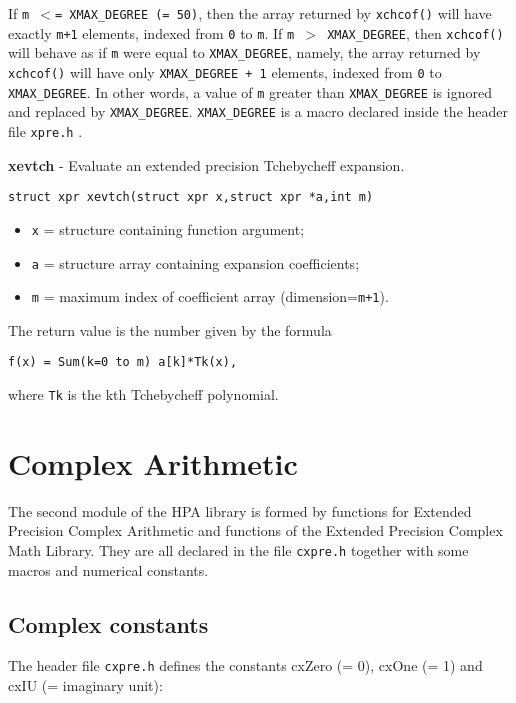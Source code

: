 \documentclass{article}
\begin{document}
If \texttt{m $<$= XMAX\_DEGREE (= 50)}, then the array returned by \texttt{xchcof()}
will have exactly \texttt{m+1} elements, indexed from \texttt{0} to \texttt{m}.
If \texttt{m $>$ XMAX\_DEGREE}, then \texttt{xchcof()} will behave as if
\texttt{m} were equal to \texttt{XMAX\_DEGREE}, namely,
the array returned by \texttt{xchcof()} will have only 
\texttt{XMAX\_DEGREE + 1} elements, indexed from \texttt{0} to \texttt{XMAX\_DEGREE}. 
In other words, a value of \texttt{m} greater than \texttt{XMAX\_DEGREE} is 
ignored and replaced by \texttt{XMAX\_DEGREE}.
\texttt{XMAX\_DEGREE} is a macro declared inside the header file
\texttt{xpre.h} .


\hrulefill{}

\textbf{xevtch} - Evaluate an extended precision Tchebycheff expansion.

\begin{verbatim}
struct xpr xevtch(struct xpr x,struct xpr *a,int m)
\end{verbatim}

\begin{itemize}
\item \texttt{x} = structure containing function argument;
\item \texttt{a} = structure array containing expansion coefficients;
\item \texttt{m} = maximum index of coefficient array (dimension=\texttt{m+1}).
\end{itemize}

The return value is the number given by the formula

\begin{verbatim}
f(x) = Sum(k=0 to m) a[k]*Tk(x), 
\end{verbatim}
where \texttt{Tk} is the kth  Tchebycheff polynomial.


\hypertarget{toc12}{}
\section{Complex Arithmetic}
The second module of the HPA library is formed by 
functions for Extended Precision Complex Arithmetic and functions 
of the Extended Precision Complex Math Library.
They are all declared in the file \texttt{cxpre.h} together with some 
macros and numerical constants.

\hypertarget{toc13}{}
\subsection{Complex constants}
The header file \texttt{cxpre.h} defines the constants
cxZero (= 0), cxOne (= 1) and cxIU (= imaginary unit):
\end{document}
